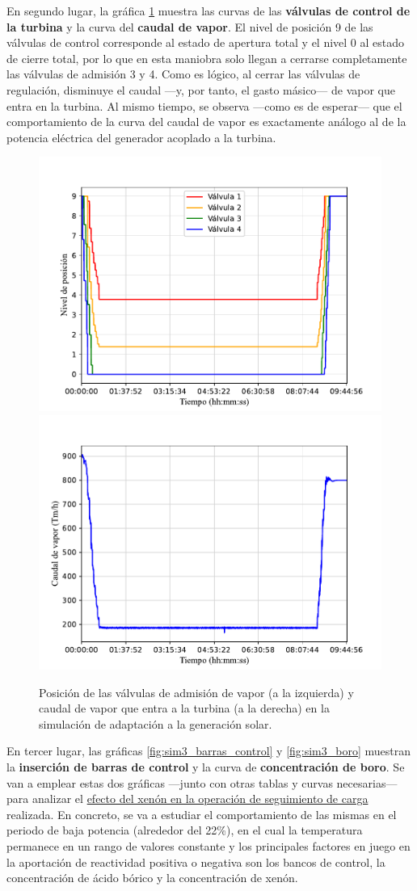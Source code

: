 En segundo lugar, la gráfica \ref{fig:sim3_valvulas_vapor} muestra las curvas de las \textbf{válvulas de control de la turbina} y la curva del \textbf{caudal de vapor}. El nivel de posición 9 de las válvulas de control corresponde al estado de apertura total y el nivel 0 al estado de cierre total, por lo que en esta maniobra solo llegan a cerrarse completamente las válvulas de admisión 3 y 4. Como es lógico, al cerrar las válvulas de regulación, disminuye el caudal ---y, por tanto, el gasto másico--- de vapor que entra en la turbina. Al mismo tiempo, se observa ---como es de esperar--- que el comportamiento de la curva del caudal de vapor es exactamente análogo al de la potencia eléctrica del generador acoplado a la turbina.

\begin{figure}[h]
  \includegraphics[width=0.5\linewidth]{content/figures/sim3_valvulas_control.pdf} 
  \includegraphics[width=0.5\linewidth]{content/figures/sim3_vapor.pdf}
  \caption{Posición de las válvulas de admisión de vapor (a la izquierda) y caudal de vapor que entra a la turbina (a la derecha) en la simulación de adaptación a la generación solar.}
  \label{fig:sim3_valvulas_vapor}
\end{figure}

En tercer lugar, las gráficas \ref{fig:sim3_barras_control} y \ref{fig:sim3_boro} muestran la \textbf{inserción de barras de control} y la curva de \textbf{concentración de boro}. Se van a emplear estas dos gráficas ---junto con otras tablas y curvas necesarias--- para analizar el \underline{efecto del xenón en la operación de seguimiento de carga} realizada. En concreto, se va a estudiar el comportamiento de las mismas en el periodo de baja potencia (alrededor del 22\%), en el cual la temperatura permanece en un rango de valores constante y los principales factores en juego en la aportación de reactividad positiva o negativa son los bancos de control, la concentración de ácido bórico y la concentración de xenón.

